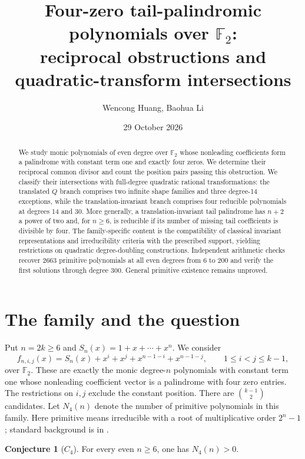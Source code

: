 \documentclass[11pt]{article}
\title{\Large Four-zero tail-palindromic polynomials over $\mathbb F_2$:\\
reciprocal obstructions and quadratic-transform intersections}
\author{Wencong Huang, Baohua Li}
\date{29 October 2026}
\theoremstyle{definition}
\newtheorem{conjecture}[proposition]{Conjecture}
\theoremstyle{remark}
\begin{document}
\maketitle
\begin{abstract}
We study monic polynomials of even degree over $\mathbb F_2$ whose nonleading coefficients form a palindrome with constant term one and exactly four zeros. We determine their reciprocal common divisor and count the position pairs passing this obstruction. We classify their intersections with full-degree quadratic rational transformations: the translated $Q$ branch comprises two infinite shape families and three degree-14 exceptions, while the translation-invariant branch comprises four reducible polynomials at degrees 14 and 30. More generally, a translation-invariant tail palindrome has $n+2$ a power of two and, for $n\ge6$, is reducible if its number of missing tail coefficients is divisible by four. The family-specific content is the compatibility of classical invariant representations and irreducibility criteria with the prescribed support, yielding restrictions on quadratic degree-doubling constructions. Independent arithmetic checks recover 2663 primitive polynomials at all even degrees from 6 to 200 and verify the first solutions through degree 300. General primitive existence remains unproved.
\end{abstract}

\section{The family and the question}\label{sec:intro}
Put $n=2k\ge6$ and $S_n(x)=1+x+\cdots+x^n$. We consider
\begin{equation}\label{eq:candidate}
 f_{n,i,j}(x)=S_n(x)+x^i+x^j+x^{n-1-i}+x^{n-1-j},
 \qquad 1\le i<j\le k-1,
\end{equation}
over $\mathbb F_2$. These are exactly the monic degree-$n$ polynomials
with constant term one whose nonleading coefficient vector is a
palindrome with four zero entries. The restrictions on $i,j$ exclude
the constant position. There are $\binom{k-1}{2}$ candidates.
Let $N_4(n)$ denote the number of primitive polynomials in this family.
Here primitive means irreducible with a root of multiplicative order
$2^n-1$; standard background is in \cite{LN}.

\begin{conjecture}[$C_4$]\label{conj:C4}
For every even $n\ge6$, one has $N_4(n)>0$.
\end{conjecture}
\end{document}
